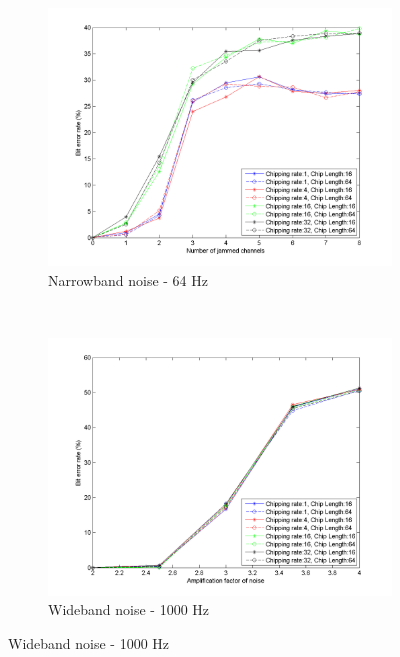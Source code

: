 			\begin{figure}[H]
				\centering
				\begin{subfigure}[b]{0.5\textwidth}
					\includegraphics[width=\textwidth]{imgs/results/plot_mode_fhss-test_narrowband-rep_20-dataRate_8-dataLength_128.png}
					\caption{Narrowband noise - 64 Hz}
					\label{fig:fhss_narrowband}
				\end{subfigure}%
				~
				\begin{subfigure}[b]{0.5\textwidth}
					\includegraphics[width=\textwidth]{imgs/results/plot_mode_fhss-test_wideband-rep_20-dataRate_8-dataLength_128.png}
					\caption{Wideband noise - 1000 Hz}
					\label{fig:fhss_wideband}
				\end{subfigure}
			\end{figure}
			
